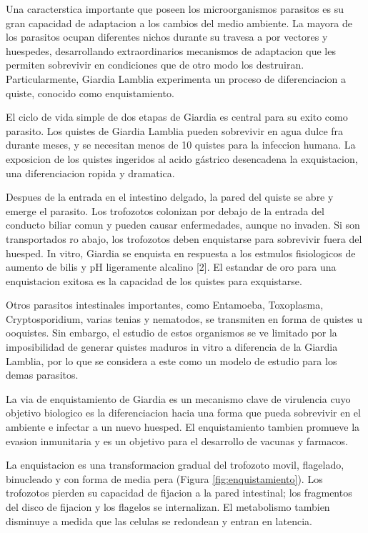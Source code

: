     Una caracterstica importante que poseen los microorganismos parasitos es su gran capacidad de
    adaptacion a los cambios del medio ambiente. La mayora de los parasitos ocupan
    diferentes nichos durante su travesa a por vectores y huespedes, desarrollando extraordinarios
    mecanismos de adaptacion que les permiten sobrevivir en condiciones que de otro modo
    los destruiran. Particularmente, Giardia Lamblia experimenta un proceso de diferenciacion
    a quiste, conocido como enquistamiento.

    El ciclo de vida simple de dos etapas de Giardia es central para su exito como parasito. Los
    quistes de Giardia Lamblia pueden sobrevivir en agua dulce fra durante meses, y se necesitan
    menos de 10 quistes para la infeccion humana. La exposicion de los quistes ingeridos al acido
    gástrico desencadena la exquistacion, una diferenciacion ropida y dramatica.

    Despues de la entrada en el intestino delgado, la pared del quiste se abre y emerge el
    parasito. Los trofozotos colonizan por debajo de la entrada del conducto biliar comun y pueden
    causar enfermedades, aunque no invaden. Si son transportados ro abajo, los trofozotos
    deben enquistarse para sobrevivir fuera del huesped. In vitro, Giardia se enquista en respuesta a
    los estmulos fisiologicos de aumento de bilis y pH ligeramente alcalino [2]. El estandar
    de oro para una enquistacion exitosa es la capacidad de los quistes para exquistarse.

    Otros parasitos intestinales importantes, como Entamoeba, Toxoplasma, Cryptosporidium, varias
    tenias y nematodos, se transmiten en forma de quistes u ooquistes. Sin embargo,
    el estudio de estos organismos se ve limitado por la imposibilidad de generar quistes maduros
    in vitro a diferencia de la Giardia Lamblia, por lo que se considera a este como un modelo
    de estudio para los demas parasitos.

    La via de enquistamiento de Giardia es un mecanismo clave de virulencia cuyo objetivo
    biologico es la diferenciacion hacia una forma que pueda sobrevivir en el ambiente e infectar
    a un nuevo huesped. El enquistamiento tambien promueve la evasion inmunitaria y es un
    objetivo para el desarrollo de vacunas y farmacos.

    La enquistacion es una transformacion gradual
    del trofozoto movil, flagelado, binucleado y con forma de media pera (Figura \ref{fig:enquistamiento}).
    Los trofozotos pierden su capacidad de fijacion a la pared intestinal; los fragmentos del disco de
    fijacion y los flagelos se internalizan. El metabolismo tambien disminuye a medida que las celulas
    se redondean y entran en latencia.

